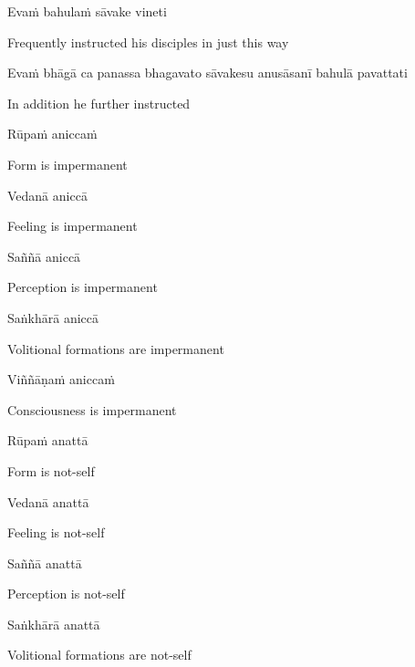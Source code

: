 Evaṁ bahulaṁ sāvake vineti

\begin{cprenglish}
  Frequently instructed his disciples in just this way
\end{cprenglish}

Evaṁ bhāgā ca panassa bhagavato sāvakesu anusāsanī bahulā pavattati

\begin{cprenglish}
  In addition he further instructed
\end{cprenglish}

Rūpaṁ aniccaṁ

\begin{cprenglish}
  Form is impermanent
\end{cprenglish}

Vedanā aniccā

\begin{cprenglish}
  Feeling is impermanent
\end{cprenglish}

Saññā aniccā

\begin{cprenglish}
  Perception is impermanent
\end{cprenglish}

Saṅkhārā aniccā

\begin{cprenglish}
  Volitional formations are impermanent
\end{cprenglish}

Viññāṇaṁ aniccaṁ

\begin{cprenglish}
  Consciousness is impermanent
\end{cprenglish}

Rūpaṁ anattā

\begin{cprenglish}
  Form is not-self
\end{cprenglish}

Vedanā anattā

\begin{cprenglish}
  Feeling is not-self
\end{cprenglish}

Saññā anattā

\begin{cprenglish}
  Perception is not-self
\end{cprenglish}

Saṅkhārā anattā

\begin{cprenglish}
  Volitional formations are not-self
\end{cprenglish}

